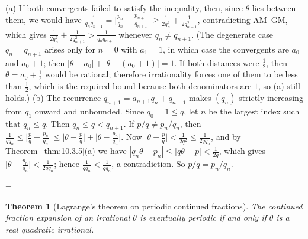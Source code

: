 \documentclass[11pt]{article}
\makeatletter
\theoremstyle{ntstyle}
\newtheorem{theorem}{Theorem}[subsection]
\let\nt@closedisplay\]
\def\nt@guardedclose{\@ifnextchar\par{\nt@closeafterpar}{\@ifnextchar\end{\postdisplaypenalty\@M\nt@closedisplay}{\nt@closedisplay}}}
\def\nt@closeafterpar\par{\@ifnextchar\par{\nt@closeafterpar}{\@ifnextchar\end{\postdisplaypenalty\@M\nt@closedisplay\par}{\nt@closedisplay\par}}}
\renewenvironment{proof}[1][\proofname]{\par
  \pushQED{\qed}\normalfont\topsep\medskipamount\edef\nt@afterproof{\@endparpenalty=\the\@endparpenalty\relax}\@beginparpenalty\@M\@endparpenalty\@M\let\]\nt@guardedclose\trivlist\item[]\textit{#1\@addpunct{.}} \ignorespaces}{\ifvmode\addpenalty\@M\fi\popQED\nt@afterproof\endtrivlist\@endpefalse}
\makeatother
\begin{document}
\begin{proof} (a) If both convergents failed to satisfy the inequality, then, since
	$\theta$ lies between them, we would have
	$\tfrac{1}{q_nq_{n+1}}=\big|\tfrac{p_n}{q_n}-\tfrac{p_{n+1}}{q_{n+1}}\big|\ge\tfrac{1}{2q_n^2}+\tfrac{1}{2q_{n+1}^2}$,
	contradicting AM--GM, which gives
	$\tfrac{1}{2q_n^2}+\tfrac{1}{2q_{n+1}^2}>\tfrac{1}{q_nq_{n+1}}$ whenever
	$q_n\neq q_{n+1}$. (The degenerate case $q_n=q_{n+1}$ arises only for
	$n=0$ with $a_1=1$, in which case the convergents are $a_0$ and $a_0+1$; then
	$|\theta-a_0|+|\theta-(a_0+1)|=1$. If both distances were
	$\tfrac{1}{2}$, then $\theta=a_0+\tfrac{1}{2}$ would be rational;
	therefore irrationality forces one of them to be
	less than $\tfrac{1}{2}$, which is the required bound because both denominators
	are $1$, so (a) still holds.) (b) The recurrence $q_{n+1}=a_{n+1}q_n+q_{n-1}$ makes $(q_n)$ strictly increasing from $q_1$ onward and unbounded.
	Since $q_0=1\le q$, let $n$ be the largest index such that $q_n\le q$.
	Then $q_n\le q<q_{n+1}$. If $p/q\neq p_n/q_n$, then
	$\tfrac{1}{qq_n}\le\big|\tfrac{p}{q}-\tfrac{p_n}{q_n}\big|\le\big|\theta-\tfrac{p}{q}\big|+\big|\theta-\tfrac{p_n}{q_n}\big|$. Now $\big|\theta-\tfrac{p}{q}\big|<\tfrac{1}{2q^2}\le\tfrac{1}{2qq_n}$, and by Theorem~\ref{thm:10.3.5}(a) we have
	$|q_n\theta-p_n|\le|q\theta-p|<\tfrac{1}{2q}$, which gives
	$\big|\theta-\tfrac{p_n}{q_n}\big|<\tfrac{1}{2qq_n}$; hence
	$\tfrac{1}{qq_n}<\tfrac{1}{qq_n}$, a contradiction. So $p/q=p_n/q_n$.

\end{proof}
\begin{theorem}[Lagrange's theorem on periodic continued fractions]\label{thm:10.3.7} The continued fraction expansion of an irrational
	$\theta$ is eventually periodic if and only if $\theta$ is a real
	quadratic irrational.

\end{theorem}
\end{document}
